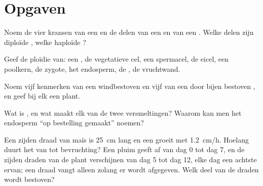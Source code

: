 \section{Opgaven}

\begin{exercise}[$\star$]\label{exo:b2:angiosperm-reproduction:1}
Noem de vier kransen van een  en de delen van een  en van
een . Welke delen zijn diploïde , welke haploïde
?
\end{exercise}

\begin{exercise}[$\star$]\label{exo:b2:angiosperm-reproduction:2}
Geef de ploïdie van: een , de vegetatieve cel, een spermacel,
de eicel, een poolkern, de zygote, het endosperm, de , de
vruchtwand.
\end{exercise}

\begin{exercise}[$\star$]\label{exo:b2:angiosperm-reproduction:3}
Noem vijf kenmerken van een windbestoven  en vijf van een door bijen
bestoven , en geef bij elk een plant.
\end{exercise}

\begin{exercise}[$\star$]\label{exo:b2:angiosperm-reproduction:4}
Wat is , en wat maakt elk van de twee versmeltingen?
Waarom kan men het endosperm ``op bestelling gemaakt'' noemen?
\end{exercise}

\begin{exercise}[$\star\star$]\label{exo:b2:angiosperm-reproduction:5}
Een zijden draad van maïs is \qty{25}{cm} lang en een  groeit
met \qty{1.2}{cm/h}. Hoelang duurt het van  tot bevruchting?
Een pluim geeft  af van dag 0 tot dag 7, en de zijden draden van
de plant verschijnen van dag 5 tot dag 12, elke dag een achtste ervan; een
draad vangt alleen  zolang er  wordt afgegeven. Welk
deel van de draden wordt bestoven?
\end{exercise}

